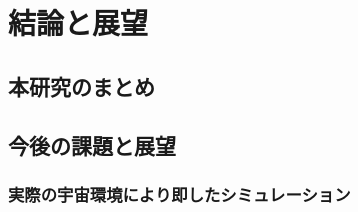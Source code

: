 \chapter{結論と展望}
\label{chap:conclusion}
\section{本研究のまとめ}
\section{今後の課題と展望}
\subsection{実際の宇宙環境により即したシミュレーション}
